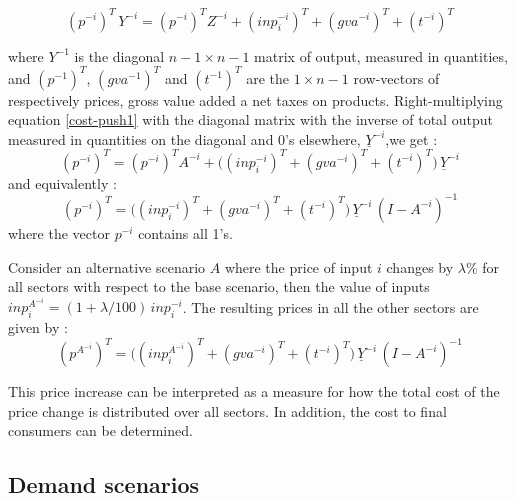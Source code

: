 \documentclass[12pt,english]{article}
\begin{document}
\begin{equation}
(p^{-i})^T \, Y^{-i} = (p^{-i})^T Z^{-i} + (inp^{-i}_i)^T + (gva^{-i})^T + (t^{-i})^T \label{cost-push1}
\end{equation}

where $Y^{-1}$ is the diagonal $n-1 \times n-1$ matrix of output, measured in quantities, and $(p^{-1})^T$, $(gva^{-1})^T$  and $(t^{-1})^T$ are the $1 \times n-1$ row-vectors of respectively prices, gross value added a net taxes on products. Right-multiplying equation \ref{cost-push1} with the diagonal matrix with the inverse of total output measured in quantities on the diagonal and 0's elsewhere, $\underline{Y}^{-i}$,we get :
\begin{equation}
(p^{-i})^T  = (p^{-i})^T A^{-i} + \Big((inp^{-i}_i)^T + (gva^{-i})^T + (t^{-i})^T \Big)\, \underline{Y}^{-i} \label{cost-push2}
\end{equation}
and equivalently :
\begin{equation}
(p^{-i})^T  =  \Big((inp^{-i}_i)^T + (gva^{-i})^T + (t^{-i})^T \Big)\, \underline{Y}^{-i} \, (I - A^{-i})^{-1} \label{cost-push3}
\end{equation}
where the vector $p^{-i}$ contains all 1's.

Consider an alternative scenario $A$ where the price of input $i$ changes by $\lambda\%$ for all sectors with respect to the base scenario, then the value of inputs $inp^{A^{-i}}_{i} = (1+\lambda/100)\, inp^{-i}_i$. The resulting prices in all the other sectors are given by :
\begin{equation}
(p^{A^{-i}})^T  =  \Big((inp^{A^{-i}}_i)^T + (gva^{-i})^T + (t^{-i})^T \Big)\, \underline{Y}^{-i} \, (I - A^{-i})^{-1} \label{cost-push-scen}
\end{equation}

This price increase can be interpreted as a measure for how the total cost of the price change is distributed over all sectors. In addition, the cost to final consumers can be determined. 

\subsection{Demand scenarios}

\end{document}
